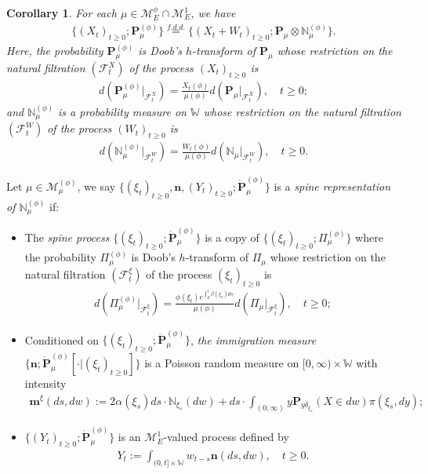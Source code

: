 \documentclass[12pt,a4paper]{amsart}
\newtheorem{cro}[thm]{Corollary}
\theoremstyle{definition}
\numberwithin{equation}{section}
\begin{document}
\begin{cro}
	For each $\mu \in \mathcal M_E^\phi \cap \mathcal M_E^1$, we have
  \begin{align}
    \{(X_t)_{t\geq 0}; \mathbf P_\mu^{(\phi)}\}
    \overset{f.d.d.}{=} \{(X_t + W_t)_{t\geq 0}; \mathbf P_\mu \otimes \mathbb N^{(\phi)}_\mu\}.
  \end{align}
	Here, the probability $\mathbf P_\mu^{(\phi)}$ is Doob's $h$-transform of $\mathbf P_\mu$ whose restriction on the natural filtration $(\mathscr F_t^X)$ of the process $(X_t)_{t\geq 0}$ is
  \begin{align}
    d ( \mathbf P_\mu^{(\phi)}|_{\mathscr F_t^X})
    = \frac{X_t(\phi)}{ \mu(\phi)} d(\mathbf P_\mu|_{\mathscr F_t^X}),
    \quad t\geq 0;
  \end{align}
	and $\mathbb N_\mu^{(\phi)}$ is a probability measure on $\mathbb W$ whose restriction on the natural filtration $(\mathscr F_t^W)$ of the process $(W_t)_{t\geq 0}$ is
  \begin{align}
    d(\mathbb N_\mu^{(\phi)} |_{\mathscr F^W_t}  )
    = \frac{W_t(\phi)}{\mu(\phi)} d(\mathbb N_\mu |_{\mathscr F^W_t}  ),
    \quad t\geq 0.
  \end{align}
\end{cro}

Let $\mu \in \mathcal M^{(\phi)}_\mu$, we say $\{(\xi_t)_{t\geq 0}, \mathbf n, (Y_t)_{ t\geq 0}; \dot {\mathbf P}^{(\phi)}_\mu\}$ is a \emph{spine representation of $\mathbb N^{(\phi)}_\mu$} if:
\begin{itemize}
\item
	The \emph{spine process} $\{(\xi_t)_{t\geq 0}; \dot{\mathbf P}^{(\phi)}_\mu\}$ is a copy of $\{(\xi_t)_{t\geq 0}; \Pi^{(\phi)}_{\mu}\}$ where the probability $\Pi_{\mu}^{(\phi)}$ is Doob's $h$-transform of $\Pi_\mu$ whose restriction on the natural filtration $(\mathscr F_t^\xi)$ of the process $(\xi_t)_{t\geq 0}$ is
  \begin{align}
    d(\Pi_{\mu}^{(\phi)} |_{\mathscr F_t^\xi})
    = \frac{\phi(\xi_t)e^{\int_0^t \beta(\xi_s)ds}}{\mu(\phi)} d(\Pi_{\mu} |_{\mathscr F_t^\xi}),
    \quad t\geq 0;
  \end{align}
\item
	Conditioned on $\{(\xi_t)_{t\geq 0}; \dot{\mathbf P}^{(\phi)}_\mu\}$, \emph{the immigration measure} $\{\mathbf n; \dot{\mathbf P}^{(\phi)}_\mu[\cdot |(\xi_t)_{t\geq 0}]\}$ is a Poisson random measure on $[0,\infty ) \times \mathbb W$ with intensity
  \begin{align}\label{eq:meanMeasImmigr}
    \mathbf m^\xi(ds,dw)
    := 2 \alpha(\xi_s) ds \cdot \mathbb N_{\xi_s}(dw) + ds \cdot \int_{(0,\infty)} y \mathbf P_{y\delta_{\xi_s}}(X\in dw) \pi(\xi_s,dy);
  \end{align}
\item
	$\{(Y_t)_{t\geq 0}; \dot{\mathbf P}^{(\phi)}_\mu\}$ is an $\mathcal M^1_E$-valued process defined by
  \begin{align}\label{eq:defSpinImmigr}
    Y_t
    := \int_{(0,t] \times \mathbb W} w_{t-s} \mathbf n(ds,dw),
    \quad t\geq 0.
  \end{align}
\end{itemize}
\end{document}
